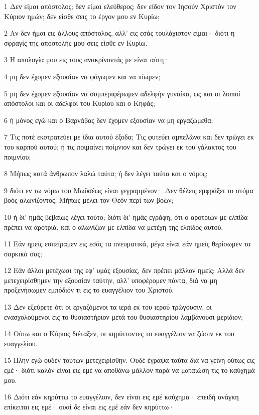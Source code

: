 \par 1 Δεν είμαι απόστολος; δεν είμαι ελεύθερος; δεν είδον τον Ιησούν Χριστόν τον Κύριον ημών; δεν είσθε σεις το έργον μου εν Κυρίω;
\par 2 Αν δεν ήμαι εις άλλους απόστολος, αλλ' εις εσάς τουλάχιστον είμαι· διότι η σφραγίς της αποστολής μου σεις είσθε εν Κυρίω.
\par 3 Η απολογία μου εις τους ανακρίνοντάς με είναι αύτη·
\par 4 μη δεν έχομεν εξουσίαν να φάγωμεν και να πίωμεν;
\par 5 μη δεν έχομεν εξουσίαν να συμπεριφέρωμεν αδελφήν γυναίκα, ως και οι λοιποί απόστολοι και οι αδελφοί του Κυρίου και ο Κηφάς;
\par 6 ή μόνος εγώ και ο Βαρνάβας δεν έχομεν εξουσίαν να μη εργαζώμεθα;
\par 7 Τις ποτέ εκστρατεύει με ίδια αυτού έξοδα; Τις φυτεύει αμπελώνα και δεν τρώγει εκ του καρπού αυτού; ή τις ποιμαίνει ποίμνιον και δεν τρώγει εκ του γάλακτος του ποιμνίου;
\par 8 Μήπως κατά άνθρωπον λαλώ ταύτα; ή δεν λέγει ταύτα και ο νόμος;
\par 9 διότι εν τω νόμω του Μωϋσέως είναι γεγραμμένον· Δεν θέλεις εμφράξει το στόμα βοός αλωνίζοντος. Μήπως μέλει τον Θεόν περί των βοών;
\par 10 ή δι' ημάς βεβαίως λέγει τούτο; διότι δι' ημάς εγράφη, ότι ο αροτριών με ελπίδα πρέπει να αροτριά, και ο αλωνίζων με ελπίδα να μετέχη της ελπίδος αυτού.
\par 11 Εάν ημείς εσπείραμεν εις εσάς τα πνευματικά, μέγα είναι εάν ημείς θερίσωμεν τα σαρκικά σας;
\par 12 Εάν άλλοι μετέχωσι της εφ' υμάς εξουσίας, δεν πρέπει μάλλον ημείς; Αλλά δεν μετεχειρίσθημεν την εξουσίαν ταύτην, αλλ' υποφέρομεν πάντα, διά να μη προξενήσωμεν εμπόδιόν τι εις το ευαγγέλιον του Χριστού.
\par 13 Δεν εξεύρετε ότι οι εργαζόμενοι τα ιερά εκ του ιερού τρώγουσιν, οι ενασχολούμενοι εις το θυσιαστήριον μετά του θυσιαστηρίου λαμβάνουσι μερίδιον;
\par 14 Ούτω και ο Κύριος διέταξεν, οι κηρύττοντες το ευαγγέλιον να ζώσιν εκ του ευαγγελίου.
\par 15 Πλην εγώ ουδέν τούτων μετεχειρίσθην. Ουδέ έγραψα ταύτα διά να γείνη ούτως εις εμέ· διότι καλόν είναι εις εμέ να αποθάνω μάλλον παρά να ματαιώση τις το καύχημά μου.
\par 16 Διότι εάν κηρύττω το ευαγγέλιον, δεν είναι εις εμέ καύχημα· επειδή ανάγκη επίκειται εις εμέ· ουαί δε είναι εις εμέ εάν δεν κηρύττω·
